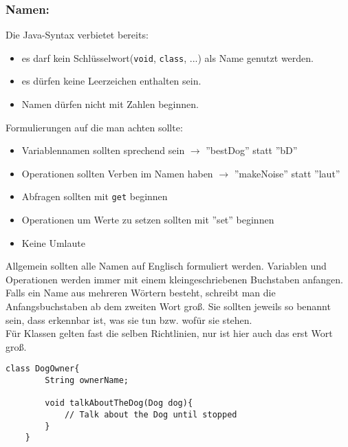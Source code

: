 \vspace{5mm}

\subsubsection*{Namen:}

\begin{Infobox}
	Die Java-Syntax verbietet bereits:
	
	\begin{itemize}
		\item es darf kein Schlüsselwort(\lstinline{void}, \lstinline{class}, ...) als Name genutzt werden.
		\item es dürfen keine Leerzeichen enthalten sein.
		\item Namen dürfen nicht mit Zahlen beginnen.
	\end{itemize}
\end{Infobox}
\vspace{5mm}
\begin{Infobox}
	Formulierungen auf die man achten sollte:
	\begin{itemize}
		\item Variablennamen sollten sprechend sein $\rightarrow$ ''bestDog'' statt ''bD''
		\item Operationen sollten Verben im Namen haben $\rightarrow$ ''makeNoise'' statt ''laut''
		\item Abfragen sollten mit \lstinline{get} beginnen
		\item Operationen um Werte zu setzen sollten mit ''set'' beginnen
		\item Keine Umlaute
		
	\end{itemize}
\end{Infobox}

\noindent
Allgemein sollten alle Namen auf Englisch formuliert werden.
Variablen und Operationen werden immer mit einem kleingeschriebenen Buchstaben anfangen.
Falls ein Name aus mehreren Wörtern besteht, schreibt man die Anfangsbuchstaben ab dem zweiten Wort groß.
Sie sollten jeweils so benannt sein, dass erkennbar ist, was sie tun bzw. wofür sie stehen.\\
Für Klassen gelten fast die selben Richtlinien, nur ist hier auch das erst Wort groß.

\begin{lstlisting}[title=\textbf{Beispiel gute Namensgebung}]
	class DogOwner{
		String ownerName;
		
		void talkAboutTheDog(Dog dog){
			// Talk about the Dog until stopped
		}
	}
\end{lstlisting}

